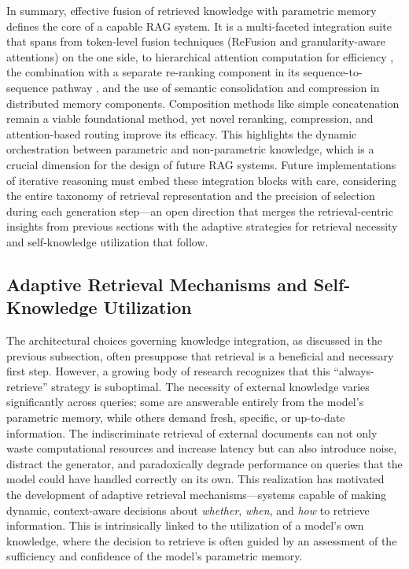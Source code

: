 \documentclass[11pt]{article}
\begin{document}
In summary, effective fusion of retrieved knowledge with parametric memory defines the core of a capable RAG system. It is a multi-faceted integration suite that spans from token-level fusion techniques (ReFusion and granularity-aware attentions) on the one side, to hierarchical attention computation for efficiency \cite{ref40}, the combination with a separate re-ranking component in its sequence-to-sequence pathway \cite{ref39}, and the use of semantic consolidation and compression in distributed memory components. Composition methods like simple concatenation remain a viable foundational method, yet novel reranking, compression, and attention-based routing improve its efficacy. This highlights the dynamic orchestration between parametric and non-parametric knowledge, which is a crucial dimension for the design of future RAG systems. Future implementations of iterative reasoning must embed these integration blocks with care, considering the entire taxonomy of retrieval representation and the precision of selection during each generation step---an open direction that merges the retrieval-centric insights from previous sections with the adaptive strategies for retrieval necessity and self-knowledge utilization that follow.

\subsection{Adaptive Retrieval Mechanisms and Self-Knowledge Utilization}

The architectural choices governing knowledge integration, as discussed in the previous subsection, often presuppose that retrieval is a beneficial and necessary first step. However, a growing body of research recognizes that this ``always-retrieve'' strategy is suboptimal. The necessity of external knowledge varies significantly across queries; some are answerable entirely from the model's parametric memory, while others demand fresh, specific, or up-to-date information. The indiscriminate retrieval of external documents can not only waste computational resources and increase latency but can also introduce noise, distract the generator, and paradoxically degrade performance on queries that the model could have handled correctly on its own. This realization has motivated the development of adaptive retrieval mechanisms---systems capable of making dynamic, context-aware decisions about \emph{whether}, \emph{when}, and \emph{how} to retrieve information. This is intrinsically linked to the utilization of a model's own knowledge, where the decision to retrieve is often guided by an assessment of the sufficiency and confidence of the model's parametric memory.
\end{document}
